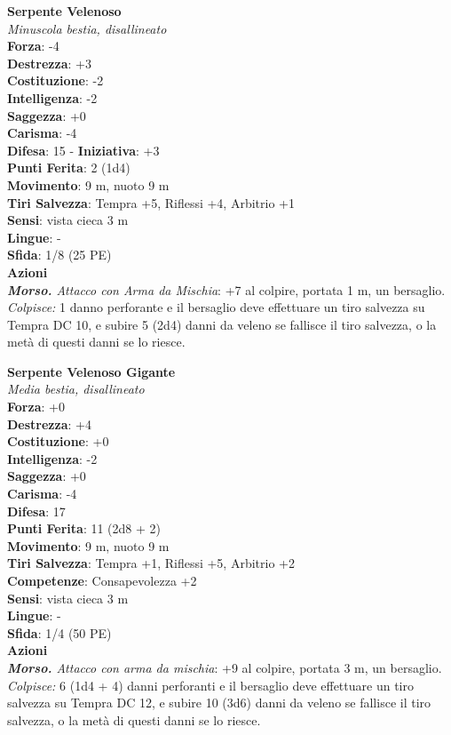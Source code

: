 \begin{multicols}{2}
\medskip\textbf{Serpente Velenoso}\\
\emph{Minuscola bestia, disallineato}\\
\textbf{Forza}: -4\\
\textbf{Destrezza}: +3\\
\textbf{Costituzione}: -2\\
\textbf{Intelligenza}: -2\\
\textbf{Saggezza}: +0\\
\textbf{Carisma}: -4\\
\textbf{Difesa}: 15 - \textbf{Iniziativa}: +3\\
\textbf{Punti Ferita}: 2 (1d4)\\
\textbf{Movimento}: 9 m, nuoto 9 m\\
\textbf{Tiri Salvezza}: Tempra +5, Riflessi +4, Arbitrio +1\\
\textbf{Sensi}: vista cieca 3 m\\
\textbf{Lingue}: -\\
\textbf{Sfida}: 1/8 (25 PE)\smallskip\\
\smallskip\textbf{Azioni}\\
\emph{\textbf{Morso.} Attacco con Arma da Mischia}: +7 al colpire, portata 1 m, un bersaglio.\\
\emph{Colpisce:} 1 danno perforante e il bersaglio deve effettuare un tiro salvezza su Tempra DC 10, e subire 5 (2d4) danni da veleno se fallisce il tiro salvezza, o la metà di questi danni se lo riesce.

\medskip\textbf{Serpente Velenoso Gigante}\\
\emph{Media bestia, disallineato}\\
\textbf{Forza}: +0\\
\textbf{Destrezza}: +4\\
\textbf{Costituzione}: +0\\
\textbf{Intelligenza}: -2\\
\textbf{Saggezza}: +0\\
\textbf{Carisma}: -4\\
\textbf{Difesa}: 17\\
\textbf{Punti Ferita}: 11 (2d8 + 2)\\
\textbf{Movimento}: 9 m, nuoto 9 m\\
\textbf{Tiri Salvezza}: Tempra +1, Riflessi +5, Arbitrio +2\\
\textbf{Competenze}: Consapevolezza +2\\
\textbf{Sensi}: vista cieca 3 m\\
\textbf{Lingue}: -\\
\textbf{Sfida}: 1/4 (50 PE)\smallskip\\
\smallskip\textbf{Azioni}\\
\emph{\textbf{Morso.} Attacco con arma da mischia}: +9 al colpire, portata 3 m, un bersaglio.\\
\emph{Colpisce:} 6 (1d4 + 4) danni perforanti e il bersaglio deve effettuare un tiro salvezza su Tempra DC  12, e subire 10 (3d6) danni da veleno se fallisce il tiro salvezza, o la metà di questi danni se lo riesce.\\


\end{multicols}
